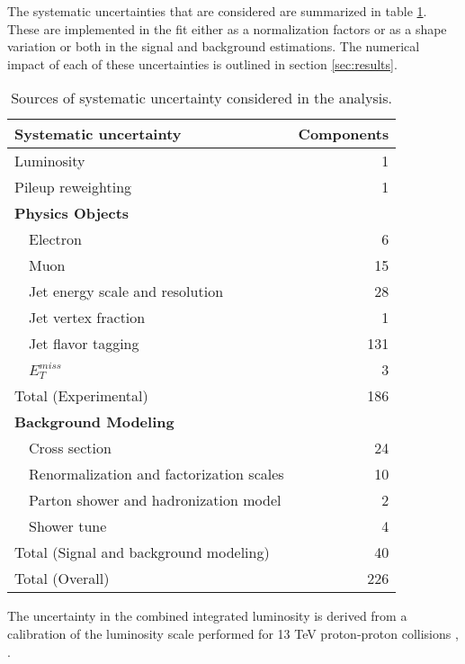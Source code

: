 
The systematic uncertainties that are considered are summarized in table \ref{tab:SystSummary}. These are implemented in the fit either as a normalization factors or as a shape variation or both in the signal and background estimations. The numerical impact of each of these uncertainties is outlined in section \ref{sec:results}.

\begin{table}[hbt!]
\centering
\caption{Sources of systematic uncertainty considered in the analysis.}
\begin{tabular}{lr}
\hline\hline
Systematic uncertainty & Components  	      \\
\hline
\hline
Luminosity	& 1		      \\
Pileup reweighting 	& 1		      \\
\textbf {Physics Objects}     	&		      \\
\ \ Electron                               	& 6		      \\
\ \ Muon	& 15		      \\
\ \ Jet energy scale and resolution  	& 28                  \\
\ \ Jet vertex fraction  	& 1		      \\
\ \ Jet flavor tagging   	& 131		      \\
\ \ $E^{miss}_T$  	& 3		      \\
\hline
Total (Experimental)        & 186		     \\
\hline
\hline
\textbf {Background Modeling}          	&		      \\
\ \ Cross section                 	& 24		      \\
\ \ Renormalization and factorization scales 	& 10		      \\
\ \ Parton shower and hadronization model       	& 2		      \\
\ \ Shower tune				& 4		      \\
\hline
Total (Signal and background modeling)       & 40		     \\
\hline\hline
Total (Overall)                             & 226	      \\
\hline\hline
\end{tabular}
\label{tab:SystSummary}
\end{table}

The uncertainty in the combined integrated luminosity is derived from a calibration of the luminosity scale performed for 13 TeV proton-proton collisions \cite{lumi}, \cite{LUCID2}.

